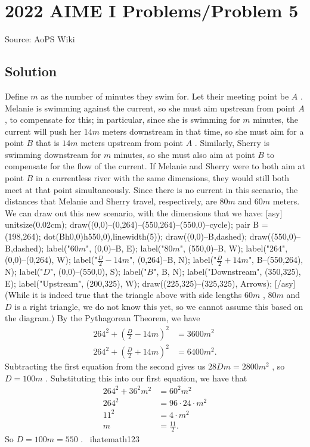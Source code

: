 \documentclass[12pt]{article}
\begin{document}
\section*{{2022 AIME I Problems/Problem 5}}
Source: AoPS Wiki

\subsection*{Solution}
Define $m$ as the number of minutes they swim for. Let their meeting point be $A$ . Melanie is swimming against the current, so she must aim upstream from point $A$ , to compensate for this; in particular, since she is swimming for $m$ minutes, the current will push her $14m$ meters downstream in that time, so she must aim for a point $B$ that is $14m$ meters upstream from point $A$ . Similarly, Sherry is swimming downstream for $m$ minutes, so she must also aim at point $B$ to compensate for the flow of the current. If Melanie and Sherry were to both aim at point $B$ in a currentless river with the same dimensions, they would still both meet at that point simultaneously. Since there is no current in this scenario, the distances that Melanie and Sherry travel, respectively, are $80m$ and $60m$ meters. We can draw out this new scenario, with the dimensions that we have: [asy] unitsize(0.02cm); draw((0,0)--(0,264)--(550,264)--(550,0)--cycle); pair B = (198,264); dot(B^^(0,0)^^(550,0),linewidth(5)); draw((0,0)--B,dashed); draw((550,0)--B,dashed); label("$60m$", (0,0)--B, E); label("$80m$", (550,0)--B, W); label("$264$", (0,0)--(0,264), W); label("$\frac{D}{2} - 14m$", (0,264)--B, N); label("$\frac{D}{2} + 14m$", B--(550,264), N); label("$D$", (0,0)--(550,0), S); label("$B$", B, N); label("Downstream", (350,325), E); label("Upstream", (200,325), W); draw((225,325)--(325,325), Arrows); [/asy] (While it is indeed true that the triangle above with side lengths $60m$ , $80m$ and $D$ is a right triangle, we do not know this yet, so we cannot assume this based on the diagram.) By the Pythagorean Theorem, we have \begin{align*} 264^{2} + \left( \frac{D}{2} - 14m \right) ^{2} &= 3600m^{2} \\ 264^{2} + \left( \frac{D}{2} + 14m \right) ^{2} &= 6400m^{2}. \end{align*} Subtracting the first equation from the second gives us $28Dm = 2800m^{2}$ , so $D = 100m$ . Substituting this into our first equation, we have that \begin{align*}264^{2} + 36^{2} m^{2} &= 60^{2}m^{2} \\ 264^{2} &= 96 \cdot 24 \cdot m^{2} \\ 11^{2} &= 4 \cdot m^{2} \\ m &= \frac{11}{2}. \end{align*} So $D = 100m = \boxed{550}$ . ~ihatemath123
\end{document}
